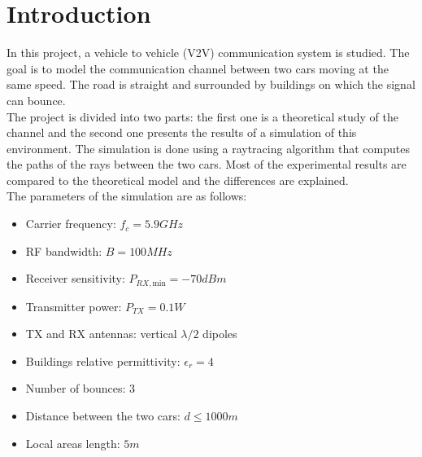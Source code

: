 \documentclass[10pt,a4paper]{ULBreport}
\begin{document}
 





\chapter{Introduction}

In this project, a vehicle to vehicle (V2V) communication system is studied. The goal is to model the communication channel between two cars moving at the same speed. The road is straight and surrounded by buildings on which the signal can bounce. \\
The project is divided into two parts: the first one is a theoretical study of the channel and the second one presents the results of a simulation of this environment. The simulation is done using a raytracing algorithm that computes the paths of the rays between the two cars. Most of the experimental results are compared to the theoretical model and the differences are explained. \\

The parameters of the simulation are as follows:
\begin{itemize}
    \item Carrier frequency: $f_c = 5.9GHz$
    \item RF bandwidth: $B = 100MHz$
    \item Receiver sensitivity: $P_{RX, \text{min}} = -70dBm$
    \item Transmitter power: $P_{TX} = 0.1W$
    \item TX and RX antennas: vertical $\lambda/2$ dipoles
    \item Buildings relative permittivity: $\epsilon_r = 4$
    \item Number of bounces: $3$
    \item Distance between the two cars: $d \leq 1000m$
    \item Local areas length: $5m$
\end{itemize}
\end{document}
